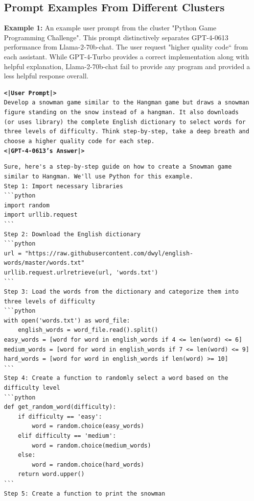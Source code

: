 \documentclass{article}
\begin{document}
\color{black}\subsection{Prompt Examples From Different Clusters}
\label{subsec:clusters-example}
\textbf{Example 1:} An example user prompt from the cluster "Python Game Programming Challenge". This prompt distinctively separates GPT-4-0613 performance from Llama-2-70b-chat. The user request "higher quality code`` from each assistant. While GPT-4-Turbo provides a correct implementation along with helpful explanation, Llama-2-70b-chat fail to provide any program and provided a less helpful response overall. 
\begin{tcolorbox}
\texttt{\textbf{<|User Prompt|>}} \\
\texttt{Develop a snowman game similar to the Hangman game but draws a snowman figure standing on the snow instead of a hangman. It also downloads (or uses library) the complete English dictionary to select words for three levels of difficulty. Think step-by-step, take a deep breath and choose a higher quality code for each step.} \\

\texttt{\textbf{<|GPT-4-0613's Answer|>}} 
\begin{lstlisting}
Sure, here's a step-by-step guide on how to create a Snowman game similar to Hangman. We'll use Python for this example.
Step 1: Import necessary libraries
```python
import random
import urllib.request
```
Step 2: Download the English dictionary
```python
url = "https://raw.githubusercontent.com/dwyl/english-words/master/words.txt"
urllib.request.urlretrieve(url, 'words.txt')
```
Step 3: Load the words from the dictionary and categorize them into three levels of difficulty
```python
with open('words.txt') as word_file:
    english_words = word_file.read().split()
easy_words = [word for word in english_words if 4 <= len(word) <= 6]
medium_words = [word for word in english_words if 7 <= len(word) <= 9]
hard_words = [word for word in english_words if len(word) >= 10]
```
Step 4: Create a function to randomly select a word based on the difficulty level
```python
def get_random_word(difficulty):
    if difficulty == 'easy':
        word = random.choice(easy_words)
    elif difficulty == 'medium':
        word = random.choice(medium_words)
    else:
        word = random.choice(hard_words)
    return word.upper()
```
Step 5: Create a function to print the snowman
\end{lstlisting}
\end{tcolorbox}
\end{document}
